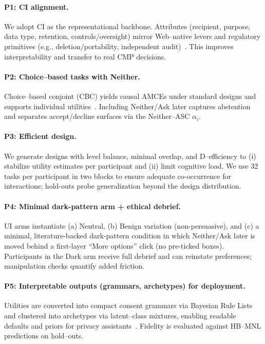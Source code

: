 \documentclass{eusset}
\newcommand{\ASC}{ASC}
\newcommand{\CI}{CI}
\newcommand{\HBMNL}{HB--MNL}
\begin{document}
\paragraph{P1: \CI{} alignment.}
We adopt \CI{} as the representational backbone. Attributes (recipient, purpose, data type, retention, controls/oversight) mirror Web–native levers and regulatory primitives (e.g., deletion/portability, independent audit)~\citep{Gupta2023ConsumerViewsJAMA}. This improves interpretability and transfer to real CMP decisions.
\paragraph{P2: Choice–based tasks with Neither.}
Choice–based conjoint (CBC) yields causal AMCEs under standard designs and supports individual utilities~\citep{Hainmueller2014ConjointID,Train2009DCMS}. Including Neither/Ask later captures abstention and separates accept/decline surfaces via the Neither–\ASC{} $\alpha_i$.
\paragraph{P3: Efficient design.}
We generate designs with level balance, minimal overlap, and D–efficiency to (i) stabilize utility estimates per participant and (ii) limit cognitive load. We use 32 tasks per participant in two blocks to ensure adequate co-occurrence for interactions; hold-outs probe generalization beyond the design distribution.
\paragraph{P4: Minimal dark-pattern arm + ethical debrief.}
UI arms instantiate (a) Neutral, (b) Benign variation (non-persuasive), and (c) a minimal, literature-backed dark-pattern condition in which Neither/Ask later is moved behind a first-layer ``More options'' click (no pre-ticked boxes). Participants in the Dark arm receive full debrief and can reinstate preferences; manipulation checks quantify added friction.
\paragraph{P5: Interpretable outputs (grammars, archetypes) for deployment.}
Utilities are converted into compact consent grammars via Bayesian Rule Lists and clustered into archetypes via latent–class mixtures, enabling readable defaults and priors for privacy assistants~\citep{Letham2015BRL,Liu2016PPA}. Fidelity is evaluated against \HBMNL{} predictions on hold–outs.
\end{document}
